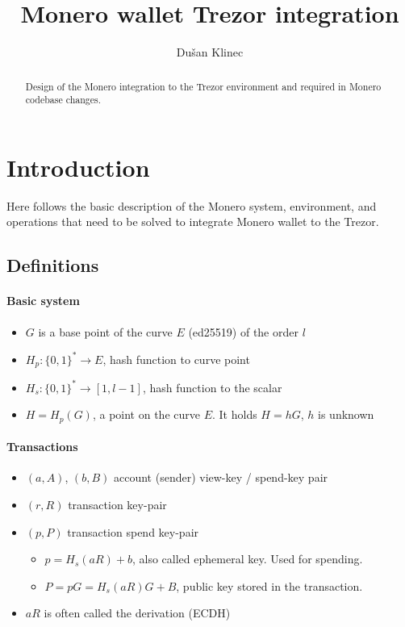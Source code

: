 \documentclass[]{article}
\title{Monero wallet Trezor integration}
\author{Du\v{s}an Klinec}
\begin{document}
	
\maketitle

\begin{abstract}
	Design of the Monero integration to the Trezor environment and required in Monero codebase changes.
\end{abstract}

\section{Introduction}
Here follows the basic description of the Monero system, environment, and operations that need to be solved to integrate Monero wallet to the Trezor.

\subsection{Definitions}

\paragraph{Basic system}

\begin{itemize}
	\item $G$ is a base point of the curve $E$ (ed25519) of the order $l$
	\item $H_p : \{0,1\}^* \rightarrow E$, hash function to curve point
	\item $H_s : \{0,1\}^* \rightarrow [1, l-1]$, hash function to the scalar
	\item $H = H_p(G)$, a point on the curve $E$. It holds $H=hG$, $h$ is unknown
	
\end{itemize}

\paragraph{Transactions}

\begin{itemize}
	\item $(a, A)$, $(b, B)$ account (sender) view-key / spend-key pair
	\item $(r, R)$ transaction key-pair 
	\item $(p, P)$ transaction spend key-pair
	\begin{itemize}
		\item $p = H_s(aR) + b$, also called ephemeral key. Used for spending.
		\item $P = pG = H_s(aR)G + B$, public key stored in the transaction.
	\end{itemize}
	\item $aR$ is often called the derivation (ECDH)
\end{itemize}
\end{document}

